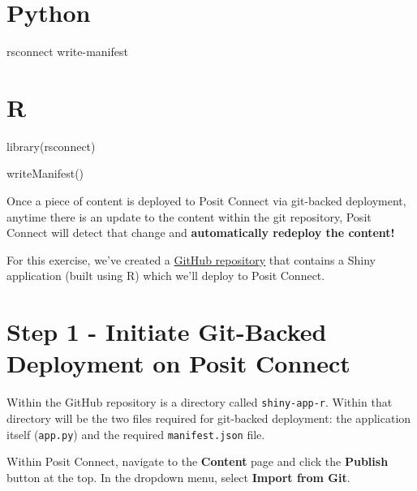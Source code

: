 \documentclass[
  letterpaper,
  DIV=11,
  numbers=noendperiod]{scrreprt}
\newenvironment{Shaded}{\begin{snugshade}}{\end{snugshade}}
\newcommand{\FunctionTok}[1]{\textcolor[rgb]{0.28,0.35,0.67}{#1}}
\newcommand{\NormalTok}[1]{\textcolor[rgb]{0.00,0.23,0.31}{#1}}
\newcommand{\OperatorTok}[1]{\textcolor[rgb]{0.37,0.37,0.37}{#1}}
\begin{document}
\section{Python}

\begin{Shaded}
\begin{Highlighting}[]
\NormalTok{rsconnect write}\OperatorTok{{-}}\NormalTok{manifest}
\end{Highlighting}
\end{Shaded}

\section{R}

\begin{Shaded}
\begin{Highlighting}[]
\FunctionTok{library}\NormalTok{(rsconnect)}

\FunctionTok{writeManifest}\NormalTok{()}
\end{Highlighting}
\end{Shaded}

Once a piece of content is deployed to Posit Connect via git-backed
deployment, anytime there is an update to the content within the git
repository, Posit Connect will detect that change and
\textbf{automatically redeploy the content!}

For this exercise, we've created a
\href{https://github.com/ryjohnson09/covid-analysis/tree/main}{GitHub
repository} that contains a Shiny application (built using R) which
we'll deploy to Posit Connect.

\section{Step 1 - Initiate Git-Backed Deployment on Posit
Connect}\label{step-1---initiate-git-backed-deployment-on-posit-connect}

Within the GitHub repository is a directory called \texttt{shiny-app-r}.
Within that directory will be the two files required for git-backed
deployment: the application itself (\texttt{app.py}) and the required
\texttt{manifest.json} file.

Within Posit Connect, navigate to the \textbf{Content} page and click
the \textbf{Publish} button at the top. In the dropdown menu, select
\textbf{Import from Git}.
\end{document}

